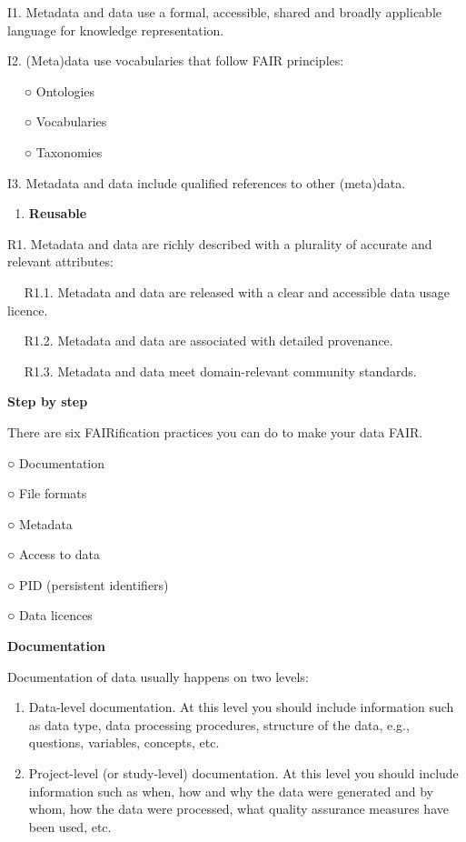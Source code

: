\documentclass[
]{book}
\providecommand{\tightlist}{%
  \setlength{\itemsep}{0pt}\setlength{\parskip}{0pt}}
\begin{document}
I1. Metadata and data use a formal, accessible, shared and broadly applicable language for knowledge representation.

I2. (Meta)data use vocabularies that follow FAIR principles:

  ○ Ontologies

  ○ Vocabularies

  ○ Taxonomies

I3. Metadata and data include qualified references to other (meta)data.

\begin{enumerate}
\def\labelenumi{\arabic{enumi}.}
\setcounter{enumi}{3}
\tightlist
\item
  \textbf{Reusable}
\end{enumerate}

R1. Metadata and data are richly described with a plurality of accurate and relevant attributes:

  R1.1. Metadata and data are released with a clear and accessible data usage licence.

  R1.2. Metadata and data are associated with detailed provenance.

  R1.3. Metadata and data meet domain-relevant community standards.

\textbf{Step by step}

There are six FAIRification practices you can do to make your data FAIR.

○ Documentation

○ File formats

○ Metadata

○ Access to data

○ PID (persistent identifiers)

○ Data licences

\textbf{Documentation}

Documentation of data usually happens on two levels:

\begin{enumerate}
\def\labelenumi{\arabic{enumi}.}
\tightlist
\item
  Data-level documentation. At this level you should include information such as data type, data processing procedures, structure of the data, e.g., questions, variables, concepts, etc.
\item
  Project-level (or study-level) documentation. At this level you should include information such as when, how and why the data were generated and by whom, how the data were processed, what quality assurance measures have been used, etc.
\end{enumerate}
\end{document}

